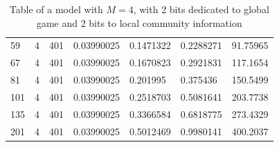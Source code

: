 \begin{table}
{\begin{tabular}{lllllll}
    59 &  4 &  401 &  0.03990025 &    0.1471322 &   0.2288271 &  91.75965 \\
    67 &  4 &  401 &  0.03990025 &    0.1670823 &   0.2921831 &  117.1654 \\
    81 &  4 &  401 &  0.03990025 &     0.201995 &    0.375436 &  150.5499 \\
   101 &  4 &  401 &  0.03990025 &    0.2518703 &   0.5081641 &  203.7738 \\
   135 &  4 &  401 &  0.03990025 &    0.3366584 &   0.6818775 &  273.4329 \\
   201 &  4 &  401 &  0.03990025 &    0.5012469 &   0.9980141 &  400.2037 \\
\bottomrule
\end{tabular}%
}
\caption{Table of a model with $M=4$, with 2 bits dedicated to global game and 2 bits to local community information}
\label{table:fixed m4}
\end{table}

